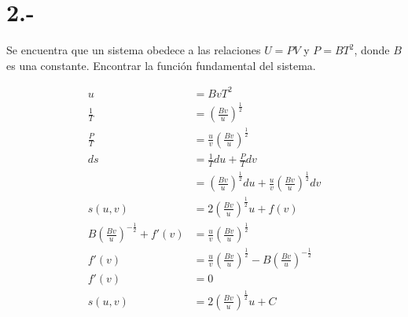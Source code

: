 \documentclass{article}
\begin{document}
\section*{2.-}
Se encuentra que un sistema obedece a las relaciones $U=PV$ y $P=BT^2$, donde $B$ es una constante.
Encontrar la función fundamental del sistema.
\begin{tcolorbox}
    \begin{align*}
        u 
        &= BvT^2 \\
        \tfrac{1}{T}
        &= (\tfrac{Bv}{u})^{\frac{1}{2}} \\
        \tfrac{P}{T}
        &= \tfrac{u}{v}(\tfrac{Bv}{u})^{\frac{1}{2}} \\
        ds
        &= \tfrac{1}{T}du + \tfrac{P}{T}dv \\
        &= (\tfrac{Bv}{u})^{\frac{1}{2}}du + \tfrac{u}{v}(\tfrac{Bv}{u})^{\frac{1}{2}}dv \\
        s(u,v)
        &= 2(\tfrac{Bv}{u})^{\frac{1}{2}}u + f(v) \\
        B(\tfrac{Bv}{u})^{-\frac{1}{2}} + f'(v) &= \tfrac{u}{v}(\tfrac{Bv}{u})^{\frac{1}{2}} \\
        f'(v) &= \tfrac{u}{v}(\tfrac{Bv}{u})^{\frac{1}{2}}-B(\tfrac{Bv}{u})^{-\frac{1}{2}} \\
        f'(v) &= 0 \\
        s(u,v) &= 2(\tfrac{Bv}{u})^{\frac{1}{2}}u+C
    \end{align*}
\end{tcolorbox}
\end{document}
